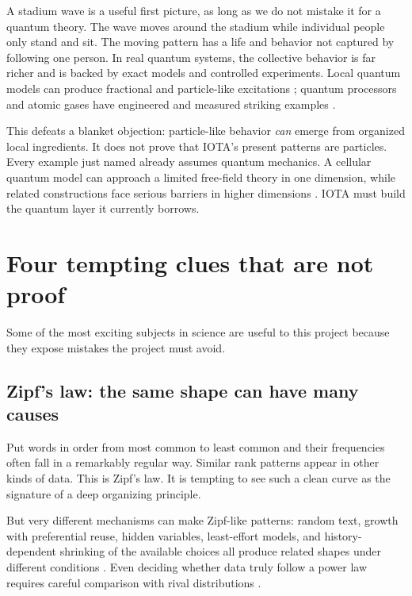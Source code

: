 \documentclass[11pt]{article}
\begin{document}
A stadium wave is a useful first picture, as long as we do not mistake it for a
quantum theory. The wave moves around the stadium while individual people only
stand and sit. The moving pattern has a life and behavior not captured by
following one person. In real quantum systems, the collective behavior is far
richer and is backed by exact models and controlled experiments. Local quantum
models can produce fractional and particle-like excitations
\citep{LevinWen2005StringNet,Kitaev2006Anyons}; quantum processors and atomic
gases have engineered and measured striking examples
\citep{IqbalEtAl2024NonAbelian,DharEtAl2025Anyonization}.

This defeats a blanket objection: particle-like behavior \emph{can} emerge
from organized local ingredients. It does not prove that IOTA's present
patterns are particles. Every example just named already assumes quantum
mechanics. A cellular quantum model can approach a limited free-field theory
in one dimension, while related constructions face serious barriers in higher
dimensions \citep{MlodinowBrun2020QCAQFT}. IOTA must build the quantum layer it
currently borrows.

\section*{Four tempting clues that are not proof}

Some of the most exciting subjects in science are useful to this project
because they expose mistakes the project must avoid.

\subsection*{Zipf's law: the same shape can have many causes}

Put words in order from most common to least common and their frequencies often
fall in a remarkably regular way. Similar rank patterns appear in other kinds
of data. This is Zipf's law. It is tempting to see such a clean curve as the
signature of a deep organizing principle.

But very different mechanisms can make Zipf-like patterns: random text,
growth with preferential reuse, hidden variables, least-effort models, and
history-dependent shrinking of the available choices all produce related
shapes under different conditions
\citep{Simon1955Skew,Li1992RandomTexts,FerrerCanchoSole2003LeastEffort,SchwabEtAl2014LatentVariables,CorominasMurtraEtAl2015SSR}.
Even deciding whether data truly follow a power law requires careful comparison
with rival distributions \citep{ClausetEtAl2009PowerLaws}.
\end{document}
